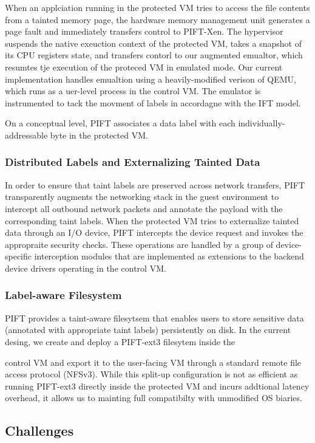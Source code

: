 When an applciation running in the protected VM tries to access the file
contents from a tainted memory page, the hardware memory management unit
generates a page fault and immediately transfers control to PIFT-Xen.
The hypervisor suspends the native exeuction context of the protected VM, takes
a snapshot of its CPU registers state, and transfers contorl to our augmented
emualtor, which resumtes tje execution of the proteced VM in emulated mode.
Our current implementation handles emualtion using a heavily-modified verison
of QEMU, which runs as a uer-level process in the control VM.  The emulator is
instrumented to tack the movment of labels in accordagne with the IFT model.

On a conceptual level, PIFT associates a data label with each
individually-addressable byte in the protected VM.


\subsubsection{Distributed Labels and Externalizing Tainted Data}
In order to ensure that taint labels are preserved across network transfers,
PIFT transparently augments the networking stack in the guest environment to
intercept all outbound network packets and annotate the payload with the
corresponding taint labels.
%
When the protected VM tries to externalize tainted data through an I/O device,
PIFT intercepts the device request and invokes the appropraite security
checks.  These operations are handled by a group of device-specific
interception modules that are implemented as extensions to the backend
device drivers operating in the control VM.


\subsubsection{Label-aware Filesystem}
PIFT provides a taint-aware filesytsem that enables users to store sensitive data
(annotated with appropriate taint labels) persistently on disk.
In the current desing, we create and deploy a PIFT-ext3 filesytem inside the

control VM and export it to the user-facing VM through a standard remote file
access protocol (NFSv3).  While this split-up configuration is not as efficient
as running PIFT-ext3 directly inside the protected VM and incurs addtional
latency overhead, it allows us to mainting full compatibilty with unmodified OS
biaries.


\subsection{Challenges}

